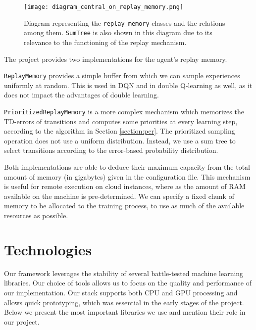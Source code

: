 \begin{figure}[ht]
    \centering
    \texttt{[image: diagram\_central\_on\_replay\_memory.png]}
    \caption{Diagram representing the \texttt{replay\_memory} classes and the relations among them.
    \texttt{SumTree} is also shown in this diagram due to its relevance to the functioning of the replay mechanism.}
\end{figure}

The project provides two implementations for the agent’s replay memory.

\texttt{ReplayMemory} provides a simple buffer from which we can sample experiences uniformly at random. This is used in DQN and in double Q-learning as well, as it does not impact the advantages of double learning.

\texttt{PrioritizedReplayMemory} is a more complex mechanism which memorizes the TD-errors of transitions and computes some priorities at every learning step, according to the algorithm in Section \ref{section:per}.
The prioritized sampling operation does not use a uniform distribution.
Instead, we use a sum tree to select transitions according to the error-based probability distribution.

Both implementations are able to deduce their maximum capacity from the total amount of memory (in gigabytes) given in the configuration file.
This mechanism is useful for remote execution on cloud instances, where as the amount of RAM available on the machine is pre-determined. We can specify a fixed chunk of memory to be allocated to the training process, to use as much of the available resources as possible.

\clearpage

\section{Technologies} \label{section:technologies}
Our framework leverages the stability of several battle-tested machine learning libraries.
Our choice of tools allows us to focus on the quality and performance of our implementation.
Our stack supports both CPU and GPU processing and allows quick prototyping, which was essential in the early stages of the project.
Below we present the most important libraries we use and mention their role in our project.

